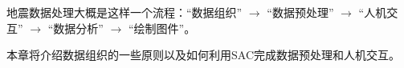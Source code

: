 地震数据处理大概是这样一个流程：``数据组织'' $\rightarrow$ ``数据预处理''
$\rightarrow$ ``人机交互'' $\rightarrow$ ``数据分析'' $\rightarrow$ ``绘制图件''。

本章将介绍数据组织的一些原则以及如何利用SAC完成数据预处理和人机交互。
